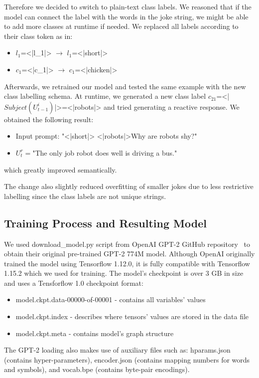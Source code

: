 Therefore we decided to switch to plain-text class labels. We reasoned that if the model can connect the label with the words in the joke string, we might be able to add more classes at runtime if needed. We replaced all labels according to their class token as in:
\begin{itemize}
    \item \(l_1\)=<|l\_1|> \(\rightarrow\) \(l_1\)=<|short|>
    \item \( c_1\)=<|c\_1|> \(\rightarrow\) \( c_1\)=<|chicken|>
\end{itemize}
Afterwards, we retrained our model and tested the same example with the new class labelling schema. At runtime, we generated a new class label \( c_{21}\)=<|\(Subject(U_{t-1}^i)\)|>=<|robots|> and tried generating a reactive response. We obtained the following result:
\begin{itemize}
    \item Input prompt: "<|short|> <|robots|>Why are robots shy?"
    \item \( U_{t}^r = \)"The only job robot does well is driving a bus."
\end{itemize}
which greatly improved semantically.

The change also slightly reduced overfitting of smaller jokes due to less restrictive labelling since the class labels are not unique strings.

\subsection{Training Process and Resulting Model}

We used download\_model.py script from OpenAI GPT-2 GitHub repository~\parencite{gpt2} to obtain their original pre-trained GPT-2 774M model. Although OpenAI originally trained the model using Tensorflow 1.12.0, it is fully compatible with Tensorflow 1.15.2 which we used for training. The model's checkpoint is over 3 GB in size and uses a Tensforflow 1.0 checkpoint format:
\begin{itemize}
    \item model.ckpt.data-00000-of-00001 - contains all variables' values
    \item model.ckpt.index - describes where tensors' values are stored in the data file 
    \item model.ckpt.meta - contains model's graph structure
\end{itemize}
The GPT-2 loading also makes use of auxiliary files such as: hparams.json (contains hyper-parameters), encoder.json (contains mapping numbers for words and symbols), and vocab.bpe (contains byte-pair encodings).


